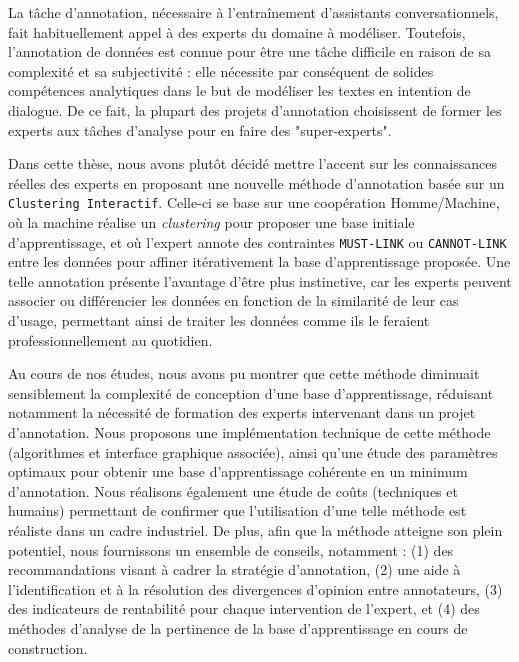\NumberAbstractPages
\begin{ThesisAbstract}

	\begin{FrenchAbstract}
		
		La tâche d'annotation, nécessaire à l'entraînement d'assistants conversationnels, fait habituellement appel à des experts du domaine à modéliser.
		Toutefois, l'annotation de données est connue pour être une tâche difficile en raison de sa complexité et sa subjectivité : elle nécessite par conséquent de solides compétences analytiques dans le but de modéliser les textes en intention de dialogue.
		De ce fait, la plupart des projets d'annotation choisissent de former les experts aux tâches d'analyse pour en faire des "super-experts".
		
		Dans cette thèse, nous avons plutôt décidé mettre l’accent sur les connaissances réelles des experts en proposant une nouvelle méthode d'annotation basée sur un \texttt{Clustering Interactif}.
		Celle-ci se base sur une coopération Homme/Machine, où la machine réalise un \textit{clustering} pour proposer une base initiale d'apprentissage, et où l'expert annote des contraintes \texttt{MUST-LINK} ou \texttt{CANNOT-LINK} entre les données pour affiner itérativement la base d'apprentissage proposée.
		Une telle annotation présente l'avantage d'être plus instinctive, car les experts peuvent associer ou différencier les données en fonction de la similarité de leur cas d'usage, permettant ainsi de traiter les données comme ils le feraient professionnellement au quotidien.
		
		Au cours de nos études, nous avons pu montrer que cette méthode diminuait sensiblement la complexité de conception d'une base d'apprentissage, réduisant notamment la nécessité de formation des experts intervenant dans un projet d'annotation.
		Nous proposons une implémentation technique de cette méthode (algorithmes et interface graphique associée), ainsi qu'une étude des paramètres optimaux pour obtenir une base d'apprentissage cohérente en un minimum d'annotation.
		Nous réalisons également une étude de coûts (techniques et humains) permettant de confirmer que l'utilisation d'une telle méthode est réaliste dans un cadre industriel.
		De plus, afin que la méthode atteigne son plein potentiel, nous fournissons un ensemble de conseils, notamment : (1) des recommandations visant à cadrer la stratégie d’annotation, (2) une aide à l'identification et à la résolution des divergences d'opinion entre annotateurs, (3) des indicateurs de rentabilité pour chaque intervention de l'expert, et (4) des méthodes d'analyse de la pertinence de la base d'apprentissage en cours de construction.
		

\end{FrenchAbstract}
\end{ThesisAbstract}
